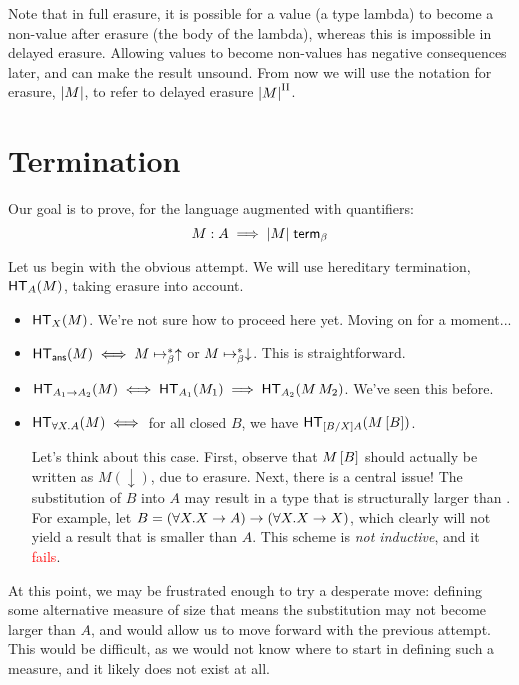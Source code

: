 \documentclass{article}
\begin{document}
Note that in full erasure, it is possible for a value (a type lambda) to become a non-value after
erasure (the body of the lambda), whereas this is impossible in delayed erasure. Allowing values
to become non-values has negative consequences later, and can make the result unsound. From now we
will use the notation for erasure, $|M|$, to refer to delayed erasure ${|M|}^{\textrm{II}}$.

\section{Termination}

Our goal is to prove, for the language augmented with quantifiers:
\[ M : A \implies {\ensuremath{|M|}} \; \mathsf{term}_{\beta} \]

Let us begin with the obvious attempt. We will use hereditary termination, $\mathsf{HT}_{A}(M)$, taking
erasure into account.

\begin{proofattempt}
\begin{itemize}
\item $\mathsf{HT}_{X}(M)$.
      We're not sure how to proceed here yet. Moving on for a moment...

\item $\mathsf{HT}_{\mathsf{ans}}(M) \iff M \mapsto_{\beta}^* \uparrow$ or $M \mapsto_{\beta}^* \downarrow$.
      This is straightforward.

\item $\mathsf{HT}_{A_1 \to A_2}(M) \iff \mathsf{HT}_{A_1}(M_1) \implies \mathsf{HT}_{A_2}(M\,M_2)$.
      We've seen this before.

\item $\mathsf{HT}_{\forall X. A}(M) \iff $ for all closed $B$, we have $\mathsf{HT}_{[B/X]A}(M\,[B])$.

      Let's think about this case. First, observe that $M\,[B]$ should actually be written as
      $M(\downarrow)$, due to erasure. Next, there is a central issue!
      The substitution of $B$ into $A$ may result in a type that is structurally larger than
      . For example, let $B=(\forall X. X \to A) \to (\forall X. X \to X)$, which
      clearly will not yield a result that is smaller than $A$. This scheme is \emph{not inductive},
      and it \textcolor{red}{fails}.
\end{itemize}
\end{proofattempt}

At this point, we may be frustrated enough to try a desperate move: defining some alternative
measure of size that means the substitution may not become larger than $A$, and would allow us to
move forward with the previous attempt. This would be difficult, as we would not know where to
start in defining such a measure, and it likely does not exist at all.
\end{document}
